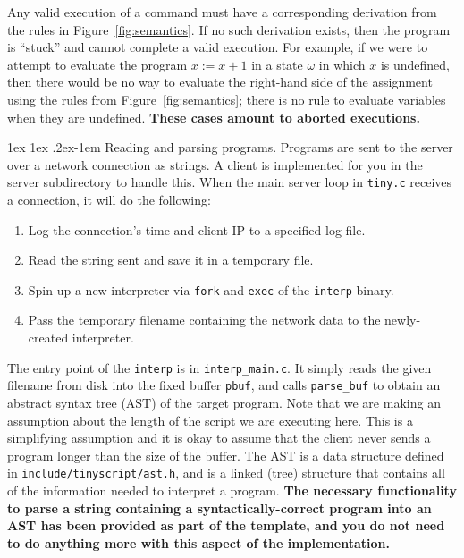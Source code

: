 \documentclass[11pt]{article}
\makeatletter
\renewcommand{\paragraph}{%
  \@startsection{paragraph}{4}%
  {\z@}{1ex \@plus 1ex \@minus .2ex}{-1em}%
  {\normalfont\normalsize\bfseries}
}
\makeatother
\begin{document}
Any valid execution of a command must have a corresponding derivation from the rules in Figure~\ref{fig:semantics}. If no such derivation exists, then the program is ``stuck'' and cannot complete a valid execution. For example, if we were to attempt to evaluate the program $x := x + 1$ in a state $\omega$ in which $x$ is undefined, then there would be no way to evaluate the right-hand side of the assignment using the rules from Figure~\ref{fig:semantics}; there is no rule to evaluate variables when they are undefined. \textbf{These cases amount to aborted executions.}

\paragraph{Reading and parsing programs.} Programs are sent to the server over a network connection as strings. A client is implemented for you in the server subdirectory to handle this. When the main server loop in \verb'tiny.c' receives a connection, it will do the following:
\begin{enumerate}
\item Log the connection's time and client IP to a specified log file.
\item Read the string sent and save it in a temporary file.
\item Spin up a new interpreter via \verb'fork' and \verb'exec' of the \verb'interp' binary.
\item Pass the temporary filename containing the network data to the newly-created interpreter.
\end{enumerate}
The entry point of the \verb'interp' is in \verb'interp_main.c'. It simply reads the given filename from disk into the fixed buffer \verb'pbuf', and calls \verb'parse_buf' to obtain an abstract syntax tree (AST) of the target program. Note that we are making an assumption about the length of the script we are executing here. This is a simplifying assumption and it is okay to assume that the client never sends a program longer than the size of the buffer. The AST is a data structure defined in \verb'include/tinyscript/ast.h', and is a linked (tree) structure that contains all of the information needed to interpret a program. \textbf{The necessary functionality to parse a string containing a syntactically-correct program into an AST has been provided as part of the template, and you do not need to do anything more with this aspect of the implementation.}
\end{document}
